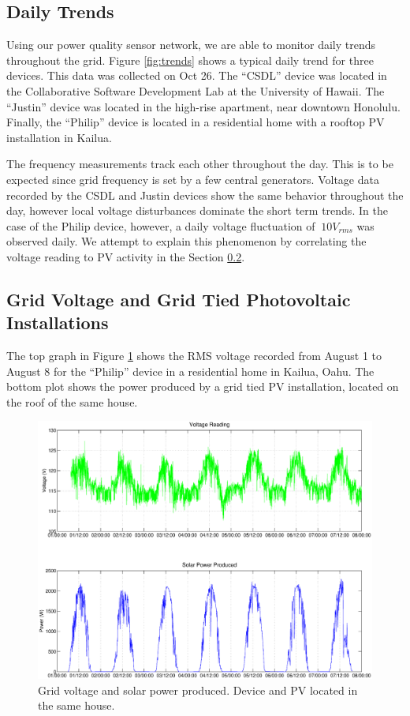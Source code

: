 \subsection{Daily Trends}

Using our power quality sensor network, we are able to monitor daily trends throughout the grid. Figure \ref{fig:trends} shows a typical daily trend for three devices. This data was 
collected on Oct 26. The ``CSDL'' device was located in the Collaborative Software Development Lab at the University of Hawaii. The ``Justin'' device was located in the high-rise apartment, near
downtown Honolulu. Finally, the ``Philip'' device is located in a residential home with a rooftop PV installation in Kailua.


The frequency measurements track each other throughout the day. This is to be expected since grid frequency is set by a few central generators. Voltage data recorded by the CSDL and  Justin devices show the same behavior throughout the day, however local voltage disturbances dominate the short term trends. In the case of the Philip device, however, a daily voltage fluctuation of $~10V_{rms}$ was observed daily. We attempt to explain this phenomenon by correlating the voltage reading to PV activity in the Section \ref{sub:PV}.

\subsection{Grid Voltage and Grid Tied Photovoltaic Installations}
\label{sub:PV}
The top graph in Figure \ref{fig:samehouse} shows the RMS voltage recorded from August 1 to August 8 for the ``Philip'' device in a residential home in Kailua, Oahu. The bottom plot shows the power produced by 
a grid tied PV installation, located on the roof of the same house.

\begin{figure}[h!]
\centering
\includegraphics[width=\textwidth]{img/solarCorelationSameHouse.eps}
\caption{Grid voltage and solar power produced. Device and PV located in the same house.}
\label{fig:samehouse}
\end{figure}


